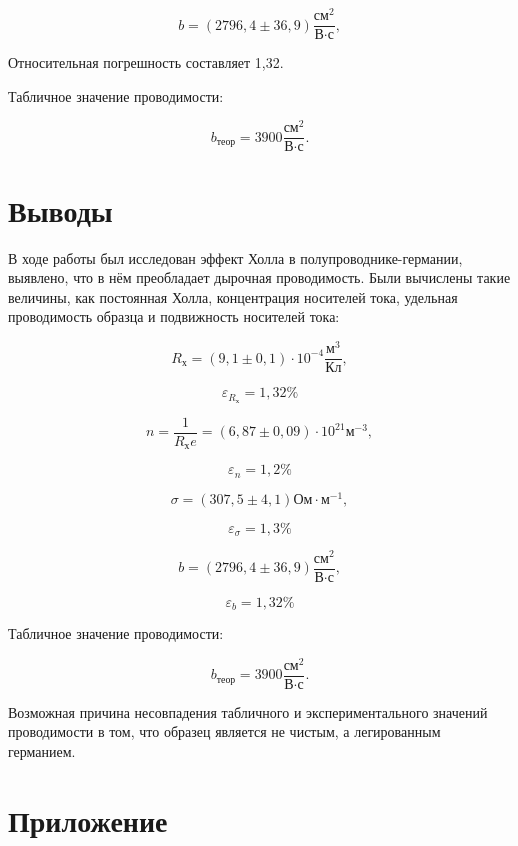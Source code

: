 \documentclass[a4paper, 12pt]{article}
\begin{document}
\[b = (2796,4\pm36,9) \frac{\text{см}^2}{\text{В}\cdot\text{с}},\]

Относительная погрешность составляет 1,32\text{\%}.

Табличное значение проводимости:

\[b_{теор} = 3900 \frac{\text{см}^2}{\text{В}\cdot\text{с}}.\]

\section{Выводы}

В ходе работы был исследован эффект Холла в полупроводнике-германии, выявлено, что в нём преобладает дырочная проводимость. Были вычислены такие величины, как постоянная Холла, концентрация носителей тока, удельная проводимость образца и подвижность носителей тока:

\[R_\text{х} = (9,1\pm0,1)\cdot10^{-4} \frac{\text{м}^3}{\text{Кл}},\] 

\[\varepsilon_{R_\text{х}} = 1,32 \text{\%}\]

\[n = \frac{1}{R_\text{х}e} = (6,87\pm0,09)\cdot10^{21} \text{м}^{-3},\]

\[\varepsilon_n = 1,2 \text{\%}\]

\[\sigma = (307,5\pm4,1) \text{Ом}\cdot\text{м}^{-1},\]

\[\varepsilon_{\sigma} = 1,3 \text{\%}\]

\[b = (2796,4\pm36,9) \frac{\text{см}^2}{\text{В}\cdot\text{с}},\]

\[\varepsilon_b = 1,32 \text{\%}\]

Табличное значение проводимости:

\[b_{теор} = 3900 \frac{\text{см}^2}{\text{В}\cdot\text{с}}.\]

Возможная причина несовпадения табличного и экспериментального значений проводимости в том, что образец является не чистым, а легированным германием.

\newpage

\section{Приложение}
\end{document}
